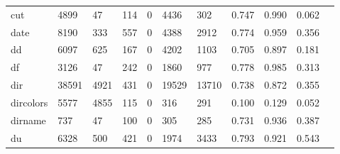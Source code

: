 \begin{longtable}{lp{1.10cm}p{1.10cm}p{1.10cm}p{1.10cm}p{1.10cm}p{1.10cm}p{1.10cm}p{1.10cm}p{1.10cm}p{1.10cm}}
cut       &                   4899 &                                 47 &                               114 &                                0 &                              4436 &                             302 &                          0.747 &                                 0.990 &                               0.062 \\
date      &                   8190 &                                333 &                               557 &                                0 &                              4388 &                            2912 &                          0.774 &                                 0.959 &                               0.356 \\
dd        &                   6097 &                                625 &                               167 &                                0 &                              4202 &                            1103 &                          0.705 &                                 0.897 &                               0.181 \\
df        &                   3126 &                                 47 &                               242 &                                0 &                              1860 &                             977 &                          0.778 &                                 0.985 &                               0.313 \\
dir       &                  38591 &                               4921 &                               431 &                                0 &                             19529 &                           13710 &                          0.738 &                                 0.872 &                               0.355 \\
dircolors &                   5577 &                               4855 &                               115 &                                0 &                               316 &                             291 &                          0.100 &                                 0.129 &                               0.052 \\
dirname   &                    737 &                                 47 &                               100 &                                0 &                               305 &                             285 &                          0.731 &                                 0.936 &                               0.387 \\
du        &                   6328 &                                500 &                               421 &                                0 &                              1974 &                            3433 &                          0.793 &                                 0.921 &                               0.543 \\

\end{longtable}
